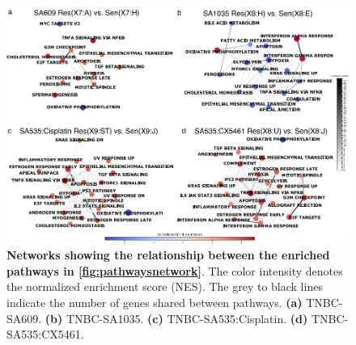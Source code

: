 \begin{figure}
\centering
  \includegraphics[width=\textwidth]{Figures/chap5/fig14_networks.pdf}
\caption[Gene pathway relationships of PDX timeseries]
	{\small
	\textbf{Networks showing the relationship between the enriched pathways in \textbf{\autoref{fig:pathwaysnetwork}}}. The color intensity denotes the normalized enrichment score (NES). The grey to black lines indicate the number of genes shared between pathways. \textbf{(a)} TNBC-SA609. \textbf{(b)} TNBC-SA1035.  \textbf{(c)} TNBC-SA535:Cisplatin. \textbf{(d)} TNBC-SA535:CX5461.
	}
	\label{fig:networks}
\end{figure}




